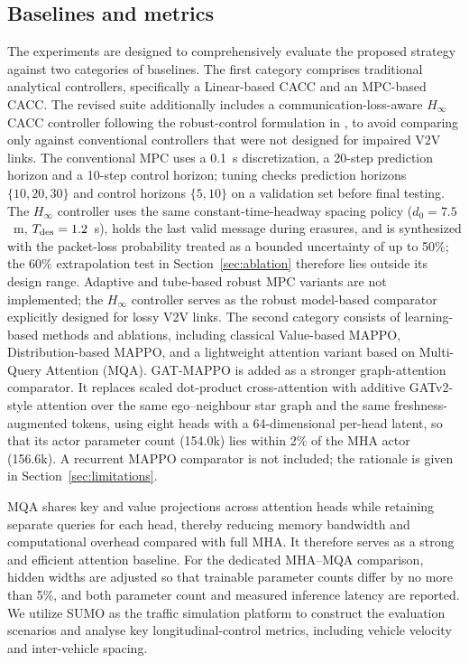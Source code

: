 \documentclass{ieeeaccess}
\begin{document}
\subsection{Baselines and metrics}
The experiments are designed to comprehensively evaluate the proposed strategy against two categories of baselines. The first category comprises traditional analytical controllers, specifically a Linear-based CACC and an MPC-based CACC. The revised suite additionally includes a communication-loss-aware $H_\infty$ CACC controller following the robust-control formulation in \cite{YANG2025103212}, to avoid comparing only against conventional controllers that were not designed for impaired V2V links. The conventional MPC uses a 0.1~s discretization, a 20-step prediction horizon and a 10-step control horizon; tuning checks prediction horizons $\{10,20,30\}$ and control horizons $\{5,10\}$ on a validation set before final testing. %
The $H_\infty$ controller uses the same constant-time-headway spacing policy ($d_0=7.5$~m, $T_{\rm des}=1.2$~s), holds the last valid message during erasures, and is synthesized with the packet-loss probability treated as a bounded uncertainty of up to 50\%; the 60\% extrapolation test in Section~\ref{sec:ablation} therefore lies outside its design range. Adaptive and tube-based robust MPC variants are not implemented; the $H_\infty$ controller serves as the robust model-based comparator explicitly designed for lossy V2V links. %
The second category consists of learning-based methods and ablations, including classical Value-based MAPPO, Distribution-based MAPPO, and a lightweight attention variant based on Multi-Query Attention (MQA). GAT-MAPPO is added as a stronger graph-attention comparator. It replaces scaled dot-product cross-attention with additive GATv2-style attention over the same ego--neighbour star graph and the same freshness-augmented tokens, using eight heads with a 64-dimensional per-head latent, so that its actor parameter count (154.0k) lies within 2\% of the MHA actor (156.6k). A recurrent MAPPO comparator is not included; the rationale is given in Section~\ref{sec:limitations}. %

MQA shares key and value projections across attention heads while retaining separate queries for each head, thereby reducing memory bandwidth and computational overhead compared with full MHA. It therefore serves as a strong and efficient attention baseline. For the dedicated MHA--MQA comparison, hidden widths are adjusted so that trainable parameter counts differ by no more than 5\%, and both parameter count and measured inference latency are reported. %
We utilize SUMO as the traffic simulation platform to construct the evaluation scenarios and analyse key longitudinal-control metrics, including vehicle velocity and inter-vehicle spacing.
\end{document}
